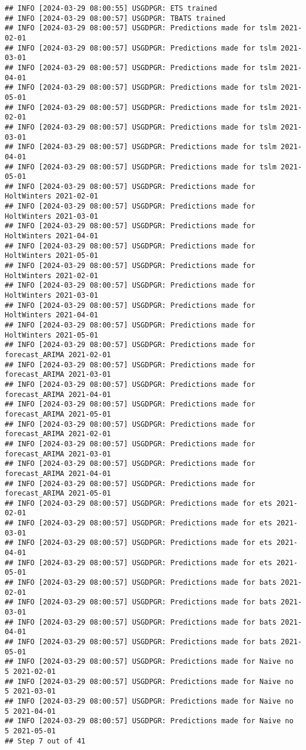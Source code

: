 \documentclass[
]{article}
\begin{document}
\begin{verbatim}
## INFO [2024-03-29 08:00:55] USGDPGR: ETS trained
## INFO [2024-03-29 08:00:57] USGDPGR: TBATS trained
## INFO [2024-03-29 08:00:57] USGDPGR: Predictions made for tslm 2021-02-01
## INFO [2024-03-29 08:00:57] USGDPGR: Predictions made for tslm 2021-03-01
## INFO [2024-03-29 08:00:57] USGDPGR: Predictions made for tslm 2021-04-01
## INFO [2024-03-29 08:00:57] USGDPGR: Predictions made for tslm 2021-05-01
## INFO [2024-03-29 08:00:57] USGDPGR: Predictions made for tslm 2021-02-01
## INFO [2024-03-29 08:00:57] USGDPGR: Predictions made for tslm 2021-03-01
## INFO [2024-03-29 08:00:57] USGDPGR: Predictions made for tslm 2021-04-01
## INFO [2024-03-29 08:00:57] USGDPGR: Predictions made for tslm 2021-05-01
## INFO [2024-03-29 08:00:57] USGDPGR: Predictions made for HoltWinters 2021-02-01
## INFO [2024-03-29 08:00:57] USGDPGR: Predictions made for HoltWinters 2021-03-01
## INFO [2024-03-29 08:00:57] USGDPGR: Predictions made for HoltWinters 2021-04-01
## INFO [2024-03-29 08:00:57] USGDPGR: Predictions made for HoltWinters 2021-05-01
## INFO [2024-03-29 08:00:57] USGDPGR: Predictions made for HoltWinters 2021-02-01
## INFO [2024-03-29 08:00:57] USGDPGR: Predictions made for HoltWinters 2021-03-01
## INFO [2024-03-29 08:00:57] USGDPGR: Predictions made for HoltWinters 2021-04-01
## INFO [2024-03-29 08:00:57] USGDPGR: Predictions made for HoltWinters 2021-05-01
## INFO [2024-03-29 08:00:57] USGDPGR: Predictions made for forecast_ARIMA 2021-02-01
## INFO [2024-03-29 08:00:57] USGDPGR: Predictions made for forecast_ARIMA 2021-03-01
## INFO [2024-03-29 08:00:57] USGDPGR: Predictions made for forecast_ARIMA 2021-04-01
## INFO [2024-03-29 08:00:57] USGDPGR: Predictions made for forecast_ARIMA 2021-05-01
## INFO [2024-03-29 08:00:57] USGDPGR: Predictions made for forecast_ARIMA 2021-02-01
## INFO [2024-03-29 08:00:57] USGDPGR: Predictions made for forecast_ARIMA 2021-03-01
## INFO [2024-03-29 08:00:57] USGDPGR: Predictions made for forecast_ARIMA 2021-04-01
## INFO [2024-03-29 08:00:57] USGDPGR: Predictions made for forecast_ARIMA 2021-05-01
## INFO [2024-03-29 08:00:57] USGDPGR: Predictions made for ets 2021-02-01
## INFO [2024-03-29 08:00:57] USGDPGR: Predictions made for ets 2021-03-01
## INFO [2024-03-29 08:00:57] USGDPGR: Predictions made for ets 2021-04-01
## INFO [2024-03-29 08:00:57] USGDPGR: Predictions made for ets 2021-05-01
## INFO [2024-03-29 08:00:57] USGDPGR: Predictions made for bats 2021-02-01
## INFO [2024-03-29 08:00:57] USGDPGR: Predictions made for bats 2021-03-01
## INFO [2024-03-29 08:00:57] USGDPGR: Predictions made for bats 2021-04-01
## INFO [2024-03-29 08:00:57] USGDPGR: Predictions made for bats 2021-05-01
## INFO [2024-03-29 08:00:57] USGDPGR: Predictions made for Naive no  5 2021-02-01
## INFO [2024-03-29 08:00:57] USGDPGR: Predictions made for Naive no  5 2021-03-01
## INFO [2024-03-29 08:00:57] USGDPGR: Predictions made for Naive no  5 2021-04-01
## INFO [2024-03-29 08:00:57] USGDPGR: Predictions made for Naive no  5 2021-05-01
## Step 7 out of 41
\end{verbatim}
\end{document}
